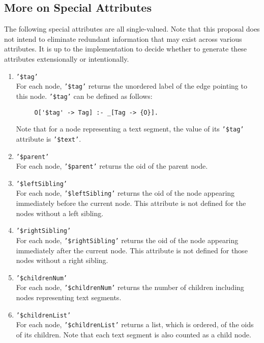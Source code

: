 \subsection{More on Special Attributes}

The following special attributes are all single-valued.  Note that
this proposal does not intend to eliminate redundant information that
may exist across various attributes. It is up to the implementation to
decide whether to generate these attributes extensionally or
intentionally.

\begin{enumerate}
\item {\tt '\$tag'} \\
For each node, {\tt '\$tag'}  returns the unordered label of the edge
pointing to this node. {\tt '\$tag'}  can be defined as follows:
  \begin{verbatim}
     O['$tag' -> Tag] :- _[Tag -> {O}].
  \end{verbatim}
Note that for a node representing a text segment, the value of
its {\tt '\$tag'}  attribute is {\tt '\$text'}. 

\item {\tt '\$parent'} \\
For each node, {\tt '\$parent'}  returns the oid of the parent node.

\item {\tt '\$leftSibling'} \\
For each node, {\tt '\$leftSibling'}  returns the oid of the node appearing
immediately before the current node. This attribute is not defined
for the nodes without a left sibling.

\item {\tt '\$rightSibling'} \\
For each node, {\tt '\$rightSibling'}  returns the oid of the node appearing
immediately after the current node. This attribute is not defined
for those nodes without a right sibling.

\item {\tt '\$childrenNum'} \\
For each node, {\tt '\$childrenNum'}  returns the number of children including
nodes representing text segments.

\item {\tt '\$childrenList'} \\
For each node, {\tt '\$childrenList'}  returns a list, which is ordered, of the
oids of its children. Note that each text segment is also counted
as a child node.


\end{enumerate}
